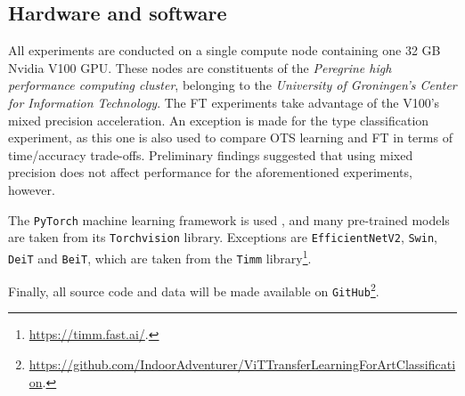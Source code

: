 \subsection{Hardware and software}
All experiments are conducted on a single compute node containing one 32 GB Nvidia V100 GPU. These nodes are constituents of the \textit{Peregrine high performance computing cluster}, belonging to the \textit{University of Groningen's Center for Information Technology}. The FT experiments take advantage of the V100's mixed precision acceleration. An exception is made for the type classification experiment, as this one is also used to compare OTS learning and FT in terms of time/accuracy trade-offs. Preliminary findings suggested that using mixed precision does not affect performance for the aforementioned experiments, however.

The \texttt{PyTorch} machine learning framework is used \citep{paszke2019pytorch}, and many pre-trained models are taken from its \texttt{Torchvision} library. Exceptions are \texttt{EfficientNetV2}, \texttt{Swin}, \texttt{DeiT} and \texttt{BeiT}, which are taken from the \texttt{Timm} library\footnote{\url{https://timm.fast.ai/}.}.

Finally, all source code and data will be made available on \texttt{GitHub}\footnote{\url{https://github.com/IndoorAdventurer/ViTTransferLearningForArtClassification}.}.

